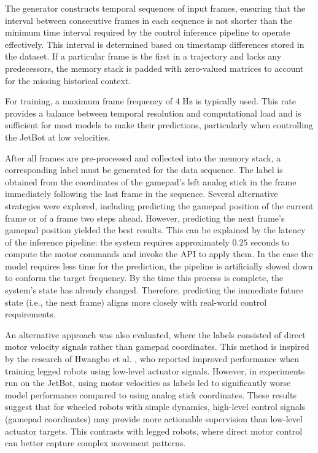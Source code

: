 The generator constructs temporal sequences of input frames, ensuring that the interval between consecutive frames in each sequence is not shorter than the minimum time interval required by the control inference pipeline to operate effectively. This interval is determined based on timestamp differences stored in the dataset. If a particular frame is the first in a trajectory and lacks any predecessors, the memory stack is padded with zero-valued matrices to account for the missing historical context.

For training, a maximum frame frequency of 4 Hz is typically used. This rate provides a balance between temporal resolution and computational load and is sufficient for most models to make their predictions, particularly when controlling the JetBot at low velocities.

After all frames are pre-processed and collected into the memory stack, a corresponding label must be generated for the data sequence. The label is obtained from the coordinates of the gamepad's left analog stick in the frame immediately following the last frame in the sequence. Several alternative strategies were explored, including predicting the gamepad position of the current frame or of a frame two steps ahead. However, predicting the next frame's gamepad position yielded the best results. This can be explained by the latency of the inference pipeline: the system requires approximately $0.25$ seconds to compute the motor commands and invoke the API to apply them. In the case the model requires less time for the prediction, the pipeline is artificially slowed down to conform the target frequency. By the time this process is complete, the system's state has already changed. Therefore, predicting the immediate future state (i.e., the next frame) aligns more closely with real-world control requirements.

An alternative approach was also evaluated, where the labels consisted of direct motor velocity signals rather than gamepad coordinates. This method is inspired by the research of Hwangbo et al. \autocite{hwangbo2019learning}, who reported improved performance when training legged robots using low-level actuator signals. However, in experiments run on the JetBot, using motor velocities as labels led to significantly worse model performance compared to using analog stick coordinates. These results suggest that for wheeled robots with simple dynamics, high-level control signals (gamepad coordinates) may provide more actionable supervision than low-level actuator targets. This contrasts with legged robots, where direct motor control can better capture complex movement patterns.

